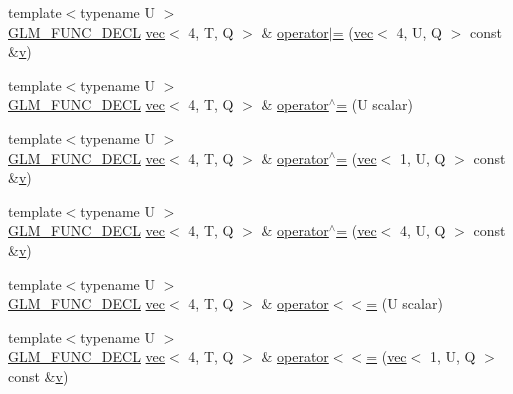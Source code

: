 \begin{DoxyCompactItemize}
\item 
{\footnotesize template$<$typename U $>$ }\\\hyperlink{setup_8hpp_ab2d052de21a70539923e9bcbf6e83a51}{G\+L\+M\+\_\+\+F\+U\+N\+C\+\_\+\+D\+E\+CL} \hyperlink{structglm_1_1vec}{vec}$<$ 4, T, Q $>$ \& \hyperlink{structglm_1_1vec_3_014_00_01_t_00_01_q_01_4_a887b2dab7b2fdd88f5d7437fd3ad7b6e}{operator$\vert$=} (\hyperlink{structglm_1_1vec}{vec}$<$ 4, U, Q $>$ const \&\hyperlink{_s_d_l__opengl_8h_a10a82eabcb59d2fcd74acee063775f90}{v})
\item 
{\footnotesize template$<$typename U $>$ }\\\hyperlink{setup_8hpp_ab2d052de21a70539923e9bcbf6e83a51}{G\+L\+M\+\_\+\+F\+U\+N\+C\+\_\+\+D\+E\+CL} \hyperlink{structglm_1_1vec}{vec}$<$ 4, T, Q $>$ \& \hyperlink{structglm_1_1vec_3_014_00_01_t_00_01_q_01_4_aafc3dadf109f736576a6e0086b7f1006}{operator$^\wedge$=} (U scalar)
\item 
{\footnotesize template$<$typename U $>$ }\\\hyperlink{setup_8hpp_ab2d052de21a70539923e9bcbf6e83a51}{G\+L\+M\+\_\+\+F\+U\+N\+C\+\_\+\+D\+E\+CL} \hyperlink{structglm_1_1vec}{vec}$<$ 4, T, Q $>$ \& \hyperlink{structglm_1_1vec_3_014_00_01_t_00_01_q_01_4_aa451218815315cd25f43b5d3e5e4f66f}{operator$^\wedge$=} (\hyperlink{structglm_1_1vec}{vec}$<$ 1, U, Q $>$ const \&\hyperlink{_s_d_l__opengl_8h_a10a82eabcb59d2fcd74acee063775f90}{v})
\item 
{\footnotesize template$<$typename U $>$ }\\\hyperlink{setup_8hpp_ab2d052de21a70539923e9bcbf6e83a51}{G\+L\+M\+\_\+\+F\+U\+N\+C\+\_\+\+D\+E\+CL} \hyperlink{structglm_1_1vec}{vec}$<$ 4, T, Q $>$ \& \hyperlink{structglm_1_1vec_3_014_00_01_t_00_01_q_01_4_af2365ef058b52638e4f9b3119f1efaa7}{operator$^\wedge$=} (\hyperlink{structglm_1_1vec}{vec}$<$ 4, U, Q $>$ const \&\hyperlink{_s_d_l__opengl_8h_a10a82eabcb59d2fcd74acee063775f90}{v})
\item 
{\footnotesize template$<$typename U $>$ }\\\hyperlink{setup_8hpp_ab2d052de21a70539923e9bcbf6e83a51}{G\+L\+M\+\_\+\+F\+U\+N\+C\+\_\+\+D\+E\+CL} \hyperlink{structglm_1_1vec}{vec}$<$ 4, T, Q $>$ \& \hyperlink{structglm_1_1vec_3_014_00_01_t_00_01_q_01_4_a4520239c55fdd62342d10feb560a0371}{operator$<$$<$=} (U scalar)
\item 
{\footnotesize template$<$typename U $>$ }\\\hyperlink{setup_8hpp_ab2d052de21a70539923e9bcbf6e83a51}{G\+L\+M\+\_\+\+F\+U\+N\+C\+\_\+\+D\+E\+CL} \hyperlink{structglm_1_1vec}{vec}$<$ 4, T, Q $>$ \& \hyperlink{structglm_1_1vec_3_014_00_01_t_00_01_q_01_4_a2bebbff20e52b3c0ceaab741bbaefec8}{operator$<$$<$=} (\hyperlink{structglm_1_1vec}{vec}$<$ 1, U, Q $>$ const \&\hyperlink{_s_d_l__opengl_8h_a10a82eabcb59d2fcd74acee063775f90}{v})

\end{DoxyCompactItemize}
